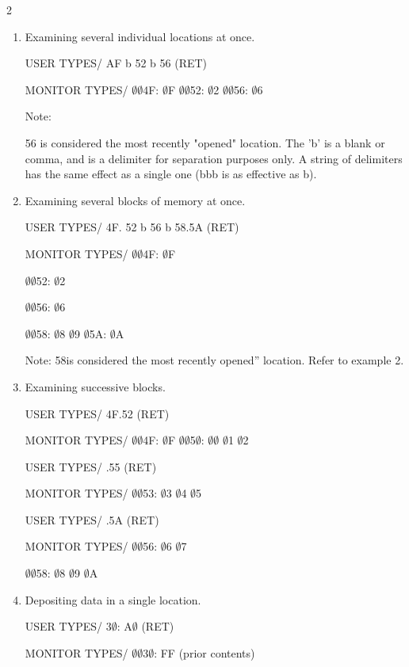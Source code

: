 \documentclass[letterpaper]{article}
\begin{document}
\begin{multicols}{2}
\begin{enumerate}
Note: Only the first location of the block (4F) is considered "opened!".

\item Examining several individual locations at once.

USER TYPES/ AF b 52 b 56 (RET)

MONITOR TYPES/ $\emptyset$$\emptyset$4F: $\emptyset$F $\emptyset$$\emptyset$52: $\emptyset$2 $\emptyset$$\emptyset$56: $\emptyset$6

Note:

56 is considered the most recently "opened" location. The 'b' is a blank or comma, and is a delimiter for separation purposes only. A string of delimiters has the same effect as a single one (bbb is as effective as b).

\item Examining several blocks of memory at once.

USER TYPES/ 4F. 52 b 56 b 58.5A (RET)

MONITOR TYPES/ $\emptyset$$\emptyset$4F: $\emptyset$F

$\emptyset$$\emptyset$52: $\emptyset$2

$\emptyset$$\emptyset$56: $\emptyset$6

$\emptyset$$\emptyset$58: $\emptyset$8 $\emptyset$9 $\emptyset$5A: $\emptyset$A


Note: 58is considered the most recently opened” location. Refer to example 2.

\item Examining successive blocks.

USER TYPES/ 4F.52 (RET)

MONITOR TYPES/ $\emptyset$$\emptyset$4F: $\emptyset$F $\emptyset$$\emptyset$5$\emptyset$: $\emptyset$$\emptyset$ $\emptyset$1 $\emptyset$2

USER TYPES/ .55 (RET)

MONITOR TYPES/ $\emptyset$$\emptyset$53: $\emptyset$3 $\emptyset$4 $\emptyset$5

USER TYPES/ .5A (RET)

MONITOR TYPES/ $\emptyset$$\emptyset$56: $\emptyset$6 $\emptyset$7

$\emptyset$$\emptyset$58: $\emptyset$8 $\emptyset$9 $\emptyset$A

\item Depositing data in a single location.

USER TYPES/ 3$\emptyset$: A$\emptyset$ (RET)

MONITOR TYPES/ $\emptyset$$\emptyset$3$\emptyset$: FF (prior contents)


\end{enumerate}
\end{multicols}
\end{document}
